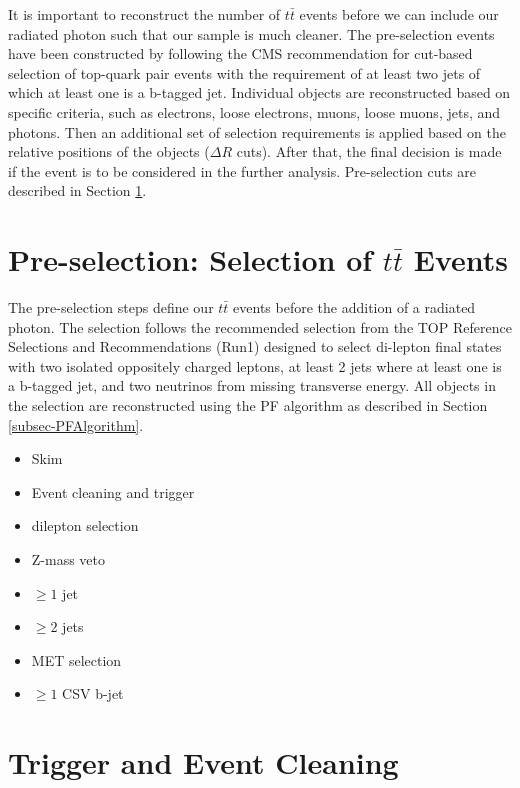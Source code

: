 It is important to reconstruct the number of $t\bar{t}$ events before we can include our radiated photon such that our sample is much cleaner. 
The pre-selection events have been constructed by following the CMS recommendation for cut-based selection of top-quark pair events with the requirement of at least two jets of which at least one is a b-tagged jet. Individual objects are reconstructed based on specific criteria, such as electrons, loose electrons, muons, loose muons, jets, and photons. Then an additional set of selection requirements is applied based on the relative positions of the objects ($\Delta R$ cuts). After that, the final decision is made if the event is to be considered in the further analysis. Pre-selection cuts are described in Section \ref{sec-preselection}.

\section{Pre-selection: Selection of $t\bar{t}$ Events} \label{sec-preselection}

The pre-selection steps define our $t\bar{t}$ events before the addition of a radiated photon. The selection follows the recommended selection from the TOP Reference Selections and Recommendations (Run1) \cite{TopEventSelection} designed to select di-lepton final states with two isolated oppositely charged leptons, at least 2 jets where at least one is a b-tagged jet, and two neutrinos from missing transverse energy. All objects in the selection are reconstructed using the PF algorithm as described in Section \ref{subsec-PFAlgorithm}.  

\begin{itemize}
	\item Skim
	\item Event cleaning and trigger
	\item dilepton selection
	\item Z-mass veto
	\item $\geq 1$ jet
	\item $\geq 2$ jets
	\item MET selection
	\item $\geq 1$ CSV b-jet 
\end{itemize}

\section{Trigger and Event Cleaning} \label{sec-TriggerAndEventCleaning}

